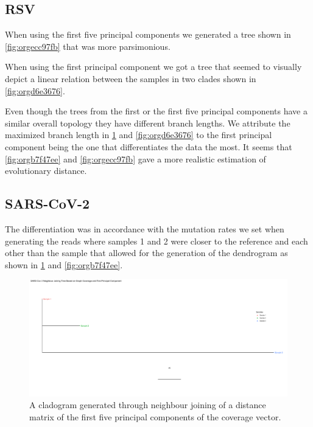 \documentclass[10pt, a4paper]{article}
\begin{document}

\subsection{RSV}
\label{sec:org1cbae70}
When using the first five principal components we generated a tree shown in 
\ref{fig:orgecc97fb} that was more parsimonious.

When using the first principal component we got a tree that seemed to visually
depict a linear relation between the samples in two clades shown in
\ref{fig:orgd6e3676}.

Even though the trees from the first or the first five principal components 
have a similar overall topology they have different branch lengths. 
We attribute the maximized branch length in \ref{fig:org629c9fd} and \ref{fig:orgd6e3676} to the
first principal component being the one that differentiates the data the most.
It seems that \ref{fig:orgb7f47ee} and \ref{fig:orgecc97fb} gave a more realistic estimation of
evolutionary distance.

\subsection{SARS-CoV-2}
\label{sec:orgc548874}
The differentiation was in accordance with the mutation rates we set when 
generating the reads where samples 1 and 2 were closer to the reference and each
other than the sample that allowed for the generation of the dendrogram as shown 
in \ref{fig:org629c9fd} and \ref{fig:orgb7f47ee}.

\begin{landscape}
\begin{figure}
\centering
\includegraphics[width=.9\linewidth]{../Figures/SARS_CoV_2/SARS_CoV_2_first_principal_component_nj_tree.png}
\caption[SARS-CoV-2 PC1 cladogram]{\label{fig:org629c9fd}
A cladogram generated through neighbour joining  of a distance matrix of the first five  principal components of the coverage vector.}
\end{figure}
\end{landscape}
\end{document}
